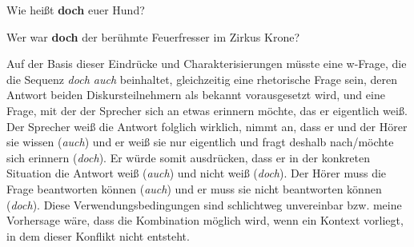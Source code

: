 {\begin{exe}
	\ex\label{873}
	Wie heißt \textbf{doch} euer Hund?
	\hfill\hbox {\citet[114]{Helbig1990}}
\end{exe}
\vspace{-0.65cm}	
\begin{exe}
	\ex\label{874}
	Wer war \textbf{doch} der berühmte Feuerfresser im Zirkus Krone?
	\hfill\hbox {\citet[88]{Dahl1988}}	
\end{exe}
Auf der Basis dieser Eindrücke und Charakterisierungen müsste eine w-Frage, die die Sequenz \textit{doch auch} beinhaltet, gleichzeitig eine rhetorische Frage sein, deren Antwort beiden Diskursteilnehmern als bekannt vorausgesetzt wird, und eine Frage, mit der der Sprecher sich an etwas erinnern möchte, das er eigentlich weiß. Der Sprecher weiß die Antwort folglich wirklich, nimmt an, dass er und der Hörer sie wissen (\textit{auch}) und er weiß sie nur eigentlich und fragt deshalb nach/möchte sich erinnern (\textit{doch}). Er würde somit ausdrücken, dass er in der konkreten Situation die Antwort weiß (\textit{auch}) und nicht weiß (\textit{doch}). Der Hörer muss die Frage beantworten können (\textit{auch}) und er muss sie nicht beantworten können (\textit{doch}). Diese Verwendungsbedingungen sind schlichtweg unvereinbar bzw. meine Vorhersage wäre, dass die Kombination möglich wird, wenn ein Kontext vorliegt, in dem dieser Konflikt nicht entsteht.

}
